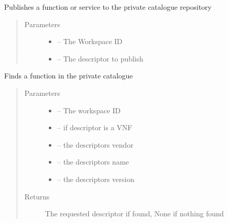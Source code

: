 \documentclass[letterpaper,10pt,english]{sphinxmanual}
\begin{document}
\begin{fulllineitems}
\label{_source/son_editor.impl:son_editor.impl.private_catalogue_impl.publish_private_nsfs}
Publishes a function or service to the private catalogue repository
\begin{quote}\begin{description}
\item[{Parameters}] \leavevmode\begin{itemize}
\item {} 
 -- The Workspace ID

\item {} 
 -- The descriptor to publish

\end{itemize}

\end{description}\end{quote}

\end{fulllineitems}


\begin{fulllineitems}
\label{_source/son_editor.impl:son_editor.impl.private_catalogue_impl.query_private_nsfs}
Finds a function in the private catalogue
\begin{quote}\begin{description}
\item[{Parameters}] \leavevmode\begin{itemize}
\item {} 
 -- The workspace ID

\item {} 
 -- if descriptor is a VNF

\item {} 
 -- the descriptors vendor

\item {} 
 -- the descriptors name

\item {} 
 -- the descriptors version

\end{itemize}

\item[{Returns}] \leavevmode
The requested descriptor if found, None if nothing found

\end{description}\end{quote}

\end{fulllineitems}
\end{document}
